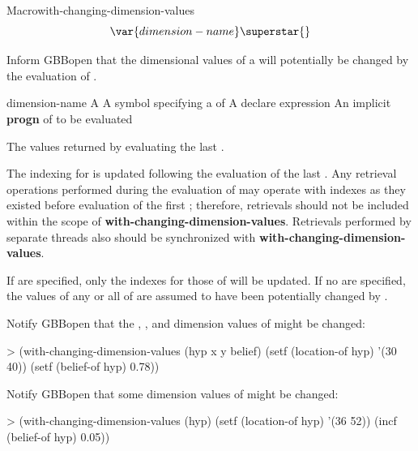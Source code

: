 \documentclass[10pt,twoside,english,pdftex]{article}
\begin{document}
\begin{functiondoc}{Macro}{with-changing-dimension-values}%
  {\code{(} 
         \[\var{dimension-name\/}\superstar{}\]\code{)}
    \superstar{}
    \superstar{}
    \returns{} \superstar}
%
  
\fnsyntax

\fnpurpose Inform GBBopen that the dimensional values of a
 will potentially be changed by the evaluation of
.

\fnpackage {}

\fnmodule {}

\fnargs
\begin{args}{dimension-name}
 A 
 A symbol specifying a  of
\arg[declaration] A declare expression
\arg[forms] An implicit \textbf{progn} of  to be evaluated
\end{args}

\fnreturns The values returned by evaluating the last .

\fndescription The indexing for  is updated following the
evaluation of the last .  Any retrieval operations performed during
the evaluation of  may operate with indexes as they existed
before evaluation of the first ; therefore, retrievals should not be
included within the scope of \textbf{with-changing-dimension-values}.
Retrievals performed by separate threads also should be synchronized with
\textbf{with-changing-dimension-values}.

If  are specified, only the indexes for those
 of  will be updated. If no
 are specified, the values of any or all
 of  are assumed to have been
potentially changed by .

\fnexamples Notify GBBopen that the , , and 
dimension values of  might be changed:
\begin{example}
> (with-changing-dimension-values (hyp x y belief)
    (setf (location-of hyp) '(30 40))
    (setf (belief-of hyp) 0.78))
\end{example}

Notify GBBopen that some dimension values of  might be changed:
\begin{example}
> (with-changing-dimension-values (hyp)
    (setf (location-of hyp) '(36 52))
    (incf (belief-of hyp) 0.05))
\end{example}

\end{functiondoc}
\end{document}
